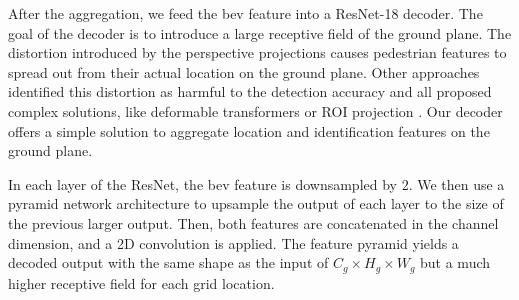 \documentclass[10pt,twocolumn,letterpaper]{article}
\begin{document}
After the aggregation, we feed the \gls{bev} feature into a ResNet-18 decoder. The goal of the decoder is to introduce a large receptive field of the ground plane. The distortion introduced by the perspective projections causes pedestrian features to spread out from their actual location on the ground plane. Other approaches \cite{hou2021multiview, song2021stacked, qiu20223d, lee2023multi} identified this distortion as harmful to the detection accuracy and all proposed complex solutions, like deformable transformers \cite{hou2021multiview} or ROI projection \cite{lee2023multi}. Our decoder offers a simple solution to aggregate location and identification features on the ground plane.

In each layer of the ResNet, the \gls{bev} feature is downsampled by $2$. We then use a pyramid network architecture to upsample the output of each layer to the size of the previous larger output. Then, both features are concatenated in the channel dimension, and a 2D convolution is applied. The feature pyramid yields a decoded output with the same shape as the input of $C_g \times H_g \times W_g$ but a much higher receptive field for each grid location. 
\end{document}
